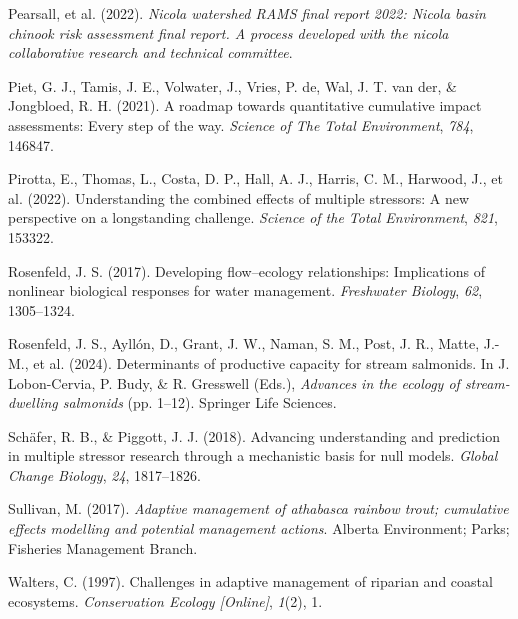 \documentclass[
  letterpaper,
  DIV=11,
  numbers=noendperiod]{scrreprt}
\newlength{\cslhangindent}
\newlength{\cslentryspacingunit} %
\newenvironment{CSLReferences}[2] %
 {%
  \setlength{\parindent}{0pt}
  \ifodd #1
  \let\oldpar\par
  \def\par{\hangindent=\cslhangindent\oldpar}
  \fi
  \setlength{\parskip}{#2\cslentryspacingunit}
 }%
 {}
\begin{document}
\begin{CSLReferences}{1}{0}
\leavevmode{}%
Pearsall, et al. (2022). \emph{Nicola watershed RAMS final report 2022:
Nicola basin chinook risk assessment final report. A process developed
with the nicola collaborative research and technical committee}.

\leavevmode{}%
Piet, G. J., Tamis, J. E., Volwater, J., Vries, P. de, Wal, J. T. van
der, \& Jongbloed, R. H. (2021). A roadmap towards quantitative
cumulative impact assessments: Every step of the way. \emph{Science of
The Total Environment}, \emph{784}, 146847.

\leavevmode{}%
Pirotta, E., Thomas, L., Costa, D. P., Hall, A. J., Harris, C. M.,
Harwood, J., et al. (2022). Understanding the combined effects of
multiple stressors: A new perspective on a longstanding challenge.
\emph{Science of the Total Environment}, \emph{821}, 153322.

\leavevmode{}%
Rosenfeld, J. S. (2017). Developing flow--ecology relationships:
Implications of nonlinear biological responses for water management.
\emph{Freshwater Biology}, \emph{62}, 1305--1324.

\leavevmode{}%
Rosenfeld, J. S., Ayllón, D., Grant, J. W., Naman, S. M., Post, J. R.,
Matte, J.-M., et al. (2024). Determinants of productive capacity for
stream salmonids. In J. Lobon-Cervia, P. Budy, \& R. Gresswell (Eds.),
\emph{Advances in the ecology of stream-dwelling salmonids} (pp. 1--12).
Springer Life Sciences.

\leavevmode{}%
Schäfer, R. B., \& Piggott, J. J. (2018). Advancing understanding and
prediction in multiple stressor research through a mechanistic basis for
null models. \emph{Global Change Biology}, \emph{24}, 1817--1826.

\leavevmode{}%
Sullivan, M. (2017). \emph{Adaptive management of athabasca rainbow
trout; cumulative effects modelling and potential management actions}.
Alberta Environment; Parks; Fisheries Management Branch.

\leavevmode{}%
Walters, C. (1997). Challenges in adaptive management of riparian and
coastal ecosystems. \emph{Conservation Ecology {[}Online{]}},
\emph{1}(2), 1.

\end{CSLReferences}
\end{document}
